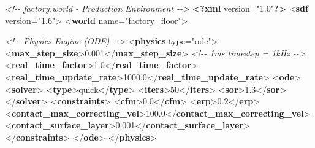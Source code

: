 \documentclass[
]{article}
\newenvironment{Shaded}{\begin{snugshade}}{\end{snugshade}}
\newcommand{\CommentTok}[1]{\textcolor[rgb]{0.56,0.35,0.01}{\textit{#1}}}
\newcommand{\FunctionTok}[1]{\textcolor[rgb]{0.13,0.29,0.53}{\textbf{#1}}}
\newcommand{\KeywordTok}[1]{\textcolor[rgb]{0.13,0.29,0.53}{\textbf{#1}}}
\newcommand{\NormalTok}[1]{#1}
\newcommand{\OtherTok}[1]{\textcolor[rgb]{0.56,0.35,0.01}{#1}}
\newcommand{\StringTok}[1]{\textcolor[rgb]{0.31,0.60,0.02}{#1}}
\begin{document}
\begin{Shaded}
\begin{Highlighting}[]
\CommentTok{\textless{}!{-}{-} factory.world {-} Production Environment {-}{-}\textgreater{}}
\FunctionTok{\textless{}?xml}\OtherTok{ version=}\StringTok{"1.0"}\FunctionTok{?\textgreater{}}
\NormalTok{\textless{}}\KeywordTok{sdf}\OtherTok{ version=}\StringTok{"1.6"}\NormalTok{\textgreater{}}
\NormalTok{  \textless{}}\KeywordTok{world}\OtherTok{ name=}\StringTok{"factory\_floor"}\NormalTok{\textgreater{}}

    \CommentTok{\textless{}!{-}{-} Physics Engine (ODE) {-}{-}\textgreater{}}
\NormalTok{    \textless{}}\KeywordTok{physics}\OtherTok{ type=}\StringTok{"ode"}\NormalTok{\textgreater{}}
\NormalTok{      \textless{}}\KeywordTok{max\_step\_size}\NormalTok{\textgreater{}0.001\textless{}/}\KeywordTok{max\_step\_size}\NormalTok{\textgreater{}  }\CommentTok{\textless{}!{-}{-} 1ms timestep = 1kHz {-}{-}\textgreater{}}
\NormalTok{      \textless{}}\KeywordTok{real\_time\_factor}\NormalTok{\textgreater{}1.0\textless{}/}\KeywordTok{real\_time\_factor}\NormalTok{\textgreater{}}
\NormalTok{      \textless{}}\KeywordTok{real\_time\_update\_rate}\NormalTok{\textgreater{}1000.0\textless{}/}\KeywordTok{real\_time\_update\_rate}\NormalTok{\textgreater{}}
\NormalTok{      \textless{}}\KeywordTok{ode}\NormalTok{\textgreater{}}
\NormalTok{        \textless{}}\KeywordTok{solver}\NormalTok{\textgreater{}}
\NormalTok{          \textless{}}\KeywordTok{type}\NormalTok{\textgreater{}quick\textless{}/}\KeywordTok{type}\NormalTok{\textgreater{}}
\NormalTok{          \textless{}}\KeywordTok{iters}\NormalTok{\textgreater{}50\textless{}/}\KeywordTok{iters}\NormalTok{\textgreater{}}
\NormalTok{          \textless{}}\KeywordTok{sor}\NormalTok{\textgreater{}1.3\textless{}/}\KeywordTok{sor}\NormalTok{\textgreater{}}
\NormalTok{        \textless{}/}\KeywordTok{solver}\NormalTok{\textgreater{}}
\NormalTok{        \textless{}}\KeywordTok{constraints}\NormalTok{\textgreater{}}
\NormalTok{          \textless{}}\KeywordTok{cfm}\NormalTok{\textgreater{}0.0\textless{}/}\KeywordTok{cfm}\NormalTok{\textgreater{}}
\NormalTok{          \textless{}}\KeywordTok{erp}\NormalTok{\textgreater{}0.2\textless{}/}\KeywordTok{erp}\NormalTok{\textgreater{}}
\NormalTok{          \textless{}}\KeywordTok{contact\_max\_correcting\_vel}\NormalTok{\textgreater{}100.0\textless{}/}\KeywordTok{contact\_max\_correcting\_vel}\NormalTok{\textgreater{}}
\NormalTok{          \textless{}}\KeywordTok{contact\_surface\_layer}\NormalTok{\textgreater{}0.001\textless{}/}\KeywordTok{contact\_surface\_layer}\NormalTok{\textgreater{}}
\NormalTok{        \textless{}/}\KeywordTok{constraints}\NormalTok{\textgreater{}}
\NormalTok{      \textless{}/}\KeywordTok{ode}\NormalTok{\textgreater{}}
\NormalTok{    \textless{}/}\KeywordTok{physics}\NormalTok{\textgreater{}}


\end{Highlighting}
\end{Shaded}
\end{document}

